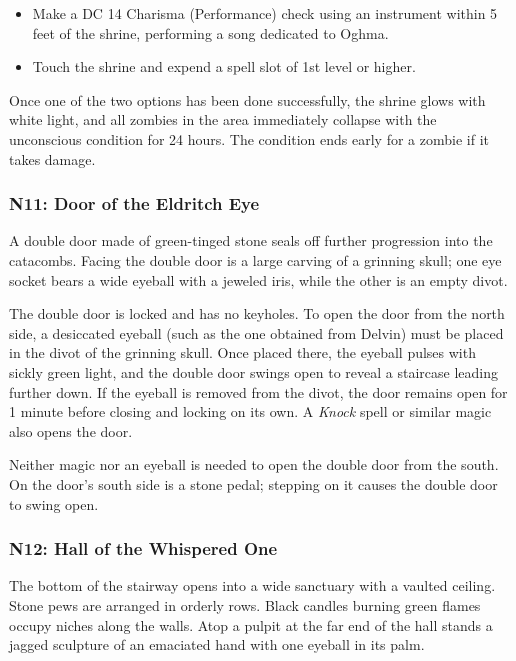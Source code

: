 \documentclass[10pt,a4paper,twoside,fancy,bg=print,twocolumn,openany,nodeprecatedcode]{dndbook}
\begin{document}
\begin{itemize}
\item Make a DC 14 Charisma (Performance) check using an instrument within 5 feet of the shrine, performing a song dedicated to Oghma.
\item Touch the shrine and expend a spell slot of 1st level or higher.
\end{itemize}

Once one of the two options has been done successfully, the shrine glows with white light, and all zombies in the area immediately collapse with the unconscious condition for 24 hours. The condition ends early for a zombie if it takes damage.

\subsubsection{N11: Door of the Eldritch Eye}
\begin{DndReadAloud}{}
A double door made of green-tinged stone seals off further progression into the catacombs. Facing the double door is a large carving of a grinning skull; one eye socket bears a wide eyeball with a jeweled iris, while the other is an empty divot.

\end{DndReadAloud}

The double door is locked and has no keyholes. To open the door from the north side, a desiccated eyeball (such as the one obtained from Delvin) must be placed in the divot of the grinning skull. Once placed there, the eyeball pulses with sickly green light, and the double door swings open to reveal a staircase leading further down. If the eyeball is removed from the divot, the door remains open for 1 minute before closing and locking on its own. A \textit{Knock} spell or similar magic also opens the door.

Neither magic nor an eyeball is needed to open the double door from the south. On the door's south side is a stone pedal; stepping on it causes the double door to swing open.

\subsubsection{N12: Hall of the Whispered One}
\begin{DndReadAloud}{}
The bottom of the stairway opens into a wide sanctuary with a vaulted ceiling. Stone pews are arranged in orderly rows. Black candles burning green flames occupy niches along the walls. Atop a pulpit at the far end of the hall stands a jagged sculpture of an emaciated hand with one eyeball in its palm.

\end{DndReadAloud}
\end{document}
